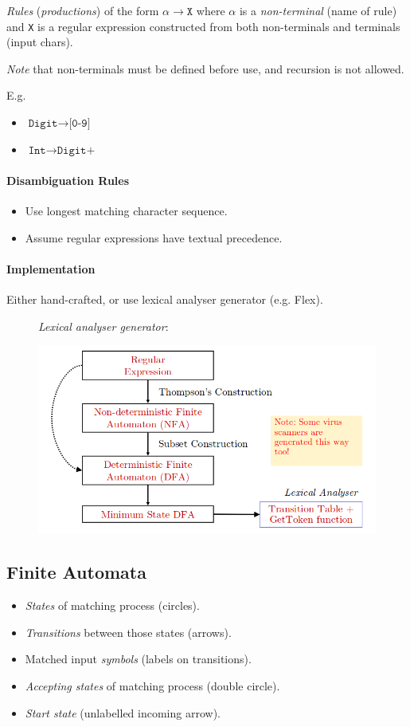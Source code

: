 \documentclass[twocolumn,english]{article}
\begin{document}
\emph{Rules} (\emph{productions}) of the form $\alpha\rightarrow\texttt{X}$
where $\alpha$ is a \emph{non-terminal} (name of rule) and \texttt{X}
is a regular expression constructed from both non-terminals and terminals
(input chars).

\emph{Note} that non-terminals must be defined before use, and recursion
is not allowed.

E.g.
\begin{itemize}
\item $\texttt{Digit}\rightarrow\texttt{[0-9]}$
\item $\texttt{Int}\rightarrow\texttt{Digit+}$
\end{itemize}

\paragraph{Disambiguation Rules}
\begin{itemize}
\item Use longest matching character sequence.
\item Assume regular expressions have textual precedence.
\end{itemize}

\paragraph{Implementation}

Either hand-crafted, or use lexical analyser generator (e.g. Flex).

\begin{figure}[H]
\begin{centering}
\emph{Lexical analyser generator}:
\par\end{centering}
\centering{}\includegraphics[width=0.75\linewidth]{img/lex}
\end{figure}


\subsection{Finite Automata}
\begin{itemize}
\item \emph{States} of matching process (circles).
\item \emph{Transitions} between those states (arrows).
\item Matched input \emph{symbols} (labels on transitions).
\item \emph{Accepting states} of matching process (double circle).
\item \emph{Start state} (unlabelled incoming arrow).
\end{itemize}
\end{document}
